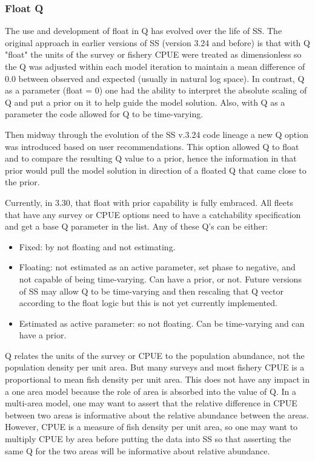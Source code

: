 \hypertarget{FloatQ}{}
\subsubsection{Float Q}
The use and development of float in Q has evolved over the life of SS. The original approach in earlier versions of SS (version 3.24 and before) is that with Q "float" the units of the survey or fishery CPUE were treated as dimensionless so the Q was adjusted within each model iteration to maintain a mean difference of 0.0 between observed and expected (usually in natural log space).  In contrast, Q as a parameter (float = 0) one had the ability to interpret the absolute scaling of Q and put a prior on it to help guide the model solution.  Also, with Q as a parameter the code allowed for Q to be time-varying.

Then midway through the evolution of the SS v.3.24 code lineage a new Q option was introduced based on user recommendations. This option allowed Q to float and to compare the resulting Q value to a prior, hence the information in that prior would pull the model solution in direction of a floated Q that came close to the prior.

Currently, in 3.30, that float with prior capability is fully embraced.  All fleets that have any survey or CPUE options need to have a catchability specification and get a base Q parameter in the list.  Any of these Q's can be either:

\begin{itemize}
	\item Fixed: by not floating and not estimating.

	\item Floating: not estimated as an active parameter, set phase to negative, and not capable of being time-varying.  Can have a prior, or not. Future versions of SS may allow Q to be time-varying and then rescaling that Q vector according to the float logic but this is not yet currently implemented.

	\item Estimated as active parameter: so not floating. Can be time-varying and can have a prior.
\end{itemize}

Q relates the units of the survey or CPUE to the population abundance, not the population density per unit area.  But many surveys and most fishery CPUE is a proportional to mean fish density per unit area.  This does not have any impact in a one area model because the role of area is absorbed into the value of Q.  In a multi-area model, one may want to assert that the relative difference in CPUE between two areas is informative about the relative abundance between the areas.   However, CPUE is a measure of fish density per unit area, so one may want to multiply CPUE by area before putting the data into SS so that asserting the same Q for the two areas will be informative about relative abundance.


